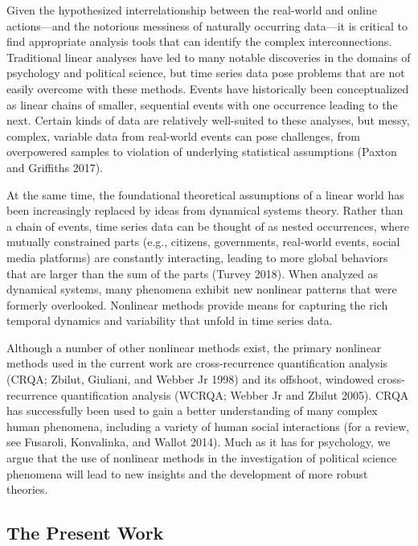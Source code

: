 \documentclass[
  english,
  man]{apa6}
\begin{document}
Given the hypothesized interrelationship between the real-world and online
actions---and the notorious messiness of naturally occurring data---it is
critical to find appropriate analysis tools that can identify the complex
interconnections. Traditional linear analyses have led to many notable
discoveries in the domains of psychology and political science, but time series
data pose problems that are not easily overcome with these methods. Events have
historically been conceptualized as linear chains of smaller, sequential events
with one occurrence leading to the next. Certain kinds of data are relatively
well-suited to these analyses, but messy, complex, variable data from real-world
events can pose challenges, from overpowered samples to violation of underlying
statistical assumptions (Paxton and Griffiths 2017).

At the same time, the foundational theoretical assumptions of a linear world has
been increasingly replaced by ideas from dynamical systems theory. Rather than a
chain of events, time series data can be thought of as nested occurrences, where
mutually constrained parts (e.g., citizens, governments, real-world events,
social media platforms) are constantly interacting, leading to more global
behaviors that are larger than the sum of the parts (Turvey 2018). When
analyzed as dynamical systems, many phenomena exhibit new nonlinear patterns
that were formerly overlooked. Nonlinear methods provide means for capturing the
rich temporal dynamics and variability that unfold in time series data.

Although a number of other nonlinear methods exist, the primary nonlinear methods
used in the current work are cross-recurrence quantification analysis (CRQA; Zbilut, Giuliani, and Webber Jr 1998) and its offshoot, windowed cross-recurrence quantification
analysis (WCRQA; Webber Jr and Zbilut 2005). CRQA has successfully been used to gain
a better understanding of many complex human phenomena, including a variety of
human social interactions (for a review, see Fusaroli, Konvalinka, and Wallot 2014). Much as it
has for psychology, we argue that the use of nonlinear methods in the
investigation of political science phenomena will lead to new insights and the
development of more robust theories.

\hypertarget{the-present-work}{%
\subsection{The Present Work}\label{the-present-work}}
\end{document}
